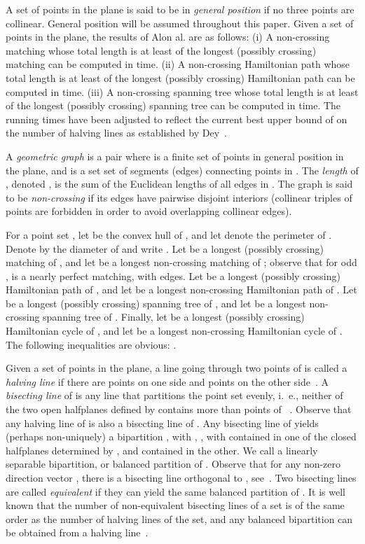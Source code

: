 \documentclass[proceedings]{stacs}
\begin{document}
\medskip
{}
A set  of points in the plane is said to be in {\em  general
position} if no three points are collinear.
General position will be assumed throughout this paper.
Given a set of  points in the plane, the results of Alon  al. are as follows:
{\rm (i)} A non-crossing matching whose total length is at least
 of the longest (possibly crossing) matching
can be computed in  time.
{\rm (ii)} A non-crossing Hamiltonian path
whose total length is at least  of the longest (possibly
crossing) Hamiltonian path can be computed in  time.
{\rm (iii)} A non-crossing spanning tree whose total length is at least
 of the longest (possibly crossing) spanning tree
can be computed in  time.
The running times have been
adjusted to reflect the current best upper bound of 
on the number of halving lines as established by Dey~\cite{De98}.

A {\em geometric graph}  is a pair  where  is a finite set
of points in general position in the plane, and  is a set set of
segments (edges) connecting points in . The {\em length} of ,
denoted , is the sum of the Euclidean lengths of all edges in
. The graph  is said to be {\em non-crossing} if its edges have
pairwise disjoint interiors (collinear triples of points are forbidden
in order to avoid overlapping collinear edges).

For a point set , let  be the convex hull of ,
and let  denote the perimeter of .
Denote by  the diameter of  and write . Let
 be a longest
(possibly crossing) matching of , and let  be a
longest non-crossing matching of ; observe that for odd ,
 is a nearly perfect matching, with  edges.
Let  be a longest (possibly crossing) Hamiltonian path
of , and let  be a longest non-crossing Hamiltonian path
of . Let  be a longest (possibly crossing) spanning tree
of , and let  be a longest non-crossing spanning tree
of . Finally, let  be a longest (possibly crossing)
Hamiltonian cycle of , and let  be a longest
non-crossing Hamiltonian cycle of . The following inequalities are obvious:
.

Given a set  of  points in the plane,
a line  going through two points of  is called a
{\em halving line} if there are  points on one side and
 points on the other side~\cite{L71}.
A {\em bisecting line}  of  is any line that partitions the point
set evenly, i.~e., neither of the two open halfplanes defined by
 contains more than  points of ~\cite{E87}.
Observe that any halving line of  is also a bisecting line of .
Any bisecting line of  yields (perhaps non-uniquely) a bipartition
, with , ,
with  contained in one of the closed halfplanes determined by
, and  contained in the other.
We call  a linearly separable bipartition, or balanced
partition of . Observe that for any non-zero direction vector
, there is a bisecting line orthogonal to ,
see~\cite[Lemma~4.4]{E87}. Two bisecting lines are called {\em equivalent}
if they can yield the same balanced partition of .
It is well known that the number of non-equivalent bisecting lines
of a set is of the same order as the number of halving lines of the set,
and any balanced bipartition can be obtained from a halving
line~\cite[pp. 67]{E87}.
\end{document}
